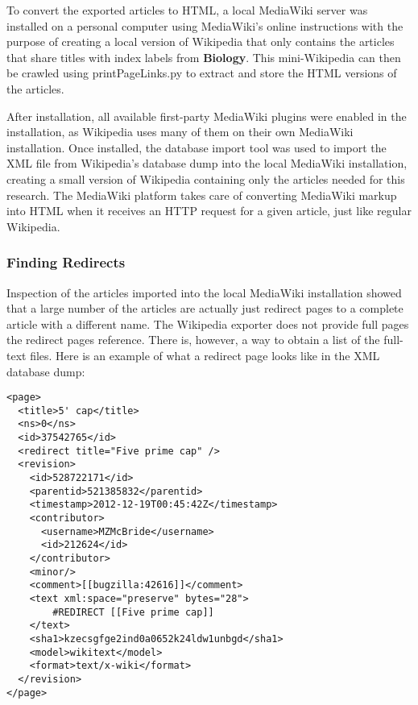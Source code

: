 To convert the exported articles to HTML, a local MediaWiki server was installed on a personal computer using MediaWiki's online instructions \cite{mediawiki-installation} with the purpose of creating a local version of Wikipedia that only contains the articles that share titles with index labels from {\bf Biology}.
This mini-Wikipedia can then be crawled using printPageLinks.py to extract and store the HTML versions of the articles.

After installation, all available first-party MediaWiki plugins were enabled in the installation, as Wikipedia uses many of them on their own MediaWiki installation.
Once installed, the database import tool \cite{mediawiki-import} was used to import the XML file from Wikipedia's database dump into the local MediaWiki installation, creating a small version of Wikipedia containing only the articles needed for this research.
The MediaWiki platform takes care of converting MediaWiki markup into HTML when it receives an HTTP request for a given article, just like regular Wikipedia.

\subsubsection{Finding Redirects}
\label{subsec:finding-redirects}

Inspection of the articles imported into the local MediaWiki installation showed that a large number of the articles are actually just redirect pages to a complete article with a different name.
The Wikipedia exporter does not provide full pages the redirect pages reference.
There is, however, a way to obtain a list of the full-text files.
Here is an example of what a redirect page looks like in the XML database dump:

\begin{lstlisting}
<page>
  <title>5' cap</title>
  <ns>0</ns>
  <id>37542765</id>
  <redirect title="Five prime cap" />
  <revision>
    <id>528722171</id>
    <parentid>521385832</parentid>
    <timestamp>2012-12-19T00:45:42Z</timestamp>
    <contributor>
      <username>MZMcBride</username>
      <id>212624</id>
    </contributor>
    <minor/>
    <comment>[[bugzilla:42616]]</comment>
    <text xml:space="preserve" bytes="28">
        #REDIRECT [[Five prime cap]]
    </text>
    <sha1>kzecsgfge2ind0a0652k24ldw1unbgd</sha1>
    <model>wikitext</model>
    <format>text/x-wiki</format>
  </revision>
</page>
\end{lstlisting}

